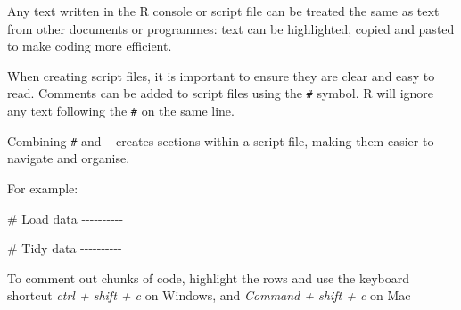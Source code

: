 \documentclass[
  letterpaper,
  DIV=11,
  numbers=noendperiod]{scrreprt}
\newenvironment{Shaded}{\begin{snugshade}}{\end{snugshade}}
\newcommand{\CommentTok}[1]{\textcolor[rgb]{0.37,0.37,0.37}{#1}}
\begin{document}
Any text written in the R console or script file can be treated the same
as text from other documents or programmes: text can be highlighted,
copied and pasted to make coding more efficient.

When creating script files, it is important to ensure they are clear and
easy to read. Comments can be added to script files using the
\texttt{\#} symbol. R will ignore any text following the \texttt{\#} on
the same line.

\begin{tcolorbox}[enhanced jigsaw, bottomrule=.15mm, left=2mm, leftrule=.75mm, bottomtitle=1mm, coltitle=black, colbacktitle=quarto-callout-tip-color!10!white, toptitle=1mm, arc=.35mm, breakable, title=\textcolor{quarto-callout-tip-color}{\faLightbulb}\hspace{0.5em}{Style tip}, rightrule=.15mm, toprule=.15mm, opacityback=0, opacitybacktitle=0.6, titlerule=0mm, colback=white, colframe=quarto-callout-tip-color-frame]

Combining \texttt{\#} and \texttt{-} creates sections within a script
file, making them easier to navigate and organise.

For example:

\begin{Shaded}
\begin{Highlighting}[]
\CommentTok{\# Load data {-}{-}{-}{-}{-}{-}{-}{-}{-}{-}}

\CommentTok{\# Tidy data {-}{-}{-}{-}{-}{-}{-}{-}{-}{-}}
\end{Highlighting}
\end{Shaded}

\end{tcolorbox}

\begin{tcolorbox}[enhanced jigsaw, bottomrule=.15mm, left=2mm, leftrule=.75mm, bottomtitle=1mm, coltitle=black, colbacktitle=quarto-callout-note-color!10!white, toptitle=1mm, arc=.35mm, breakable, title=\textcolor{quarto-callout-note-color}{\faInfo}\hspace{0.5em}{Helpful hint}, rightrule=.15mm, toprule=.15mm, opacityback=0, opacitybacktitle=0.6, titlerule=0mm, colback=white, colframe=quarto-callout-note-color-frame]

To comment out chunks of code, highlight the rows and use the keyboard
shortcut \emph{ctrl + shift + c} on Windows, and \emph{Command + shift +
c} on Mac

\end{tcolorbox}
\end{document}
